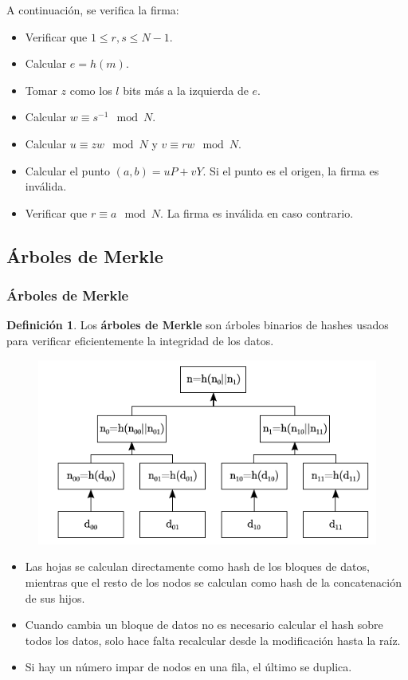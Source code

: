 \documentclass{beamer}
\theoremstyle{definition}
\newtheorem{defi}{Definición}
\begin{document}
\begin{frame}
A continuación, se verifica la firma:
\begin{itemize}
	\item<1-> Verificar que $1\leq r,s\leq N-1$.
	\item<2-> Calcular $e=h(m)$.
	\item<3-> Tomar $z$ como los $l$ bits más a la izquierda de $e$.
	\item<4-> Calcular $w\equiv s^{-1}\mod N$.
	\item<5-> Calcular $u\equiv zw\mod N$ y $v\equiv rw\mod N$. 
	\item<6-> Calcular el punto $(a,b)=uP+vY$. Si el punto es el origen, la firma es inválida.
	\item<7-> Verificar que $r\equiv a\mod N$. La firma es inválida en caso contrario.
\end{itemize}	
\end{frame}



\subsection{Árboles de Merkle}

\begin{frame}
	\frametitle{Árboles de Merkle}
	\begin{defi}
		Los \textbf{árboles de Merkle} son árboles binarios de hashes usados para verificar eficientemente la integridad de los datos.
	\end{defi}
\begin{figure}[h!]
	\includegraphics[scale=0.5]{merkle}
\end{figure}
\end{frame}
\begin{frame}
	\begin{itemize}
		\item<1-> Las hojas se calculan directamente como hash de los bloques de datos, mientras que el resto de los nodos se calculan como hash de la concatenación de sus hijos.
		\item<2-> Cuando cambia un bloque de datos no es necesario calcular el hash sobre todos los datos, solo hace falta recalcular desde la modificación hasta la raíz. 
		\item<3-> Si hay un número impar de nodos en una fila, el último se duplica.
	\end{itemize}
\end{frame}
\end{document}
